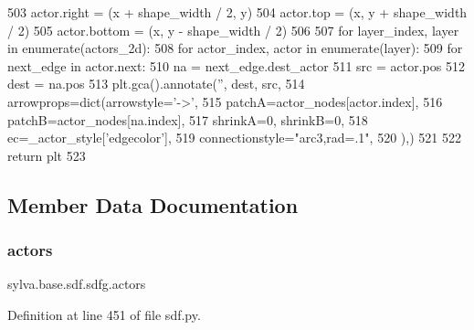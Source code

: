 \begin{DoxyCode}
503                     actor.right = (x + shape\_width / 2, y)
504                     actor.top = (x, y + shape\_width / 2)
505                     actor.bottom = (x, y - shape\_width / 2)
506 
507             \textcolor{keywordflow}{for} layer\_index, layer \textcolor{keywordflow}{in} enumerate(actors\_2d):
508                 \textcolor{keywordflow}{for} actor\_index, actor \textcolor{keywordflow}{in} enumerate(layer):
509                     \textcolor{keywordflow}{for} next\_edge \textcolor{keywordflow}{in} actor.next:
510                         na = next\_edge.dest\_actor
511                         src = actor.pos
512                         dest = na.pos
513                         plt.gca().annotate(\textcolor{stringliteral}{''}, dest, src,
514                                            arrowprops=dict(arrowstyle=\textcolor{stringliteral}{'->'},
515                                                            patchA=actor\_nodes[actor.index],
516                                                            patchB=actor\_nodes[na.index],
517                                                            shrinkA=0, shrinkB=0,
518                                                            ec=\_actor\_style[\textcolor{stringliteral}{'edgecolor'}],
519                                                            connectionstyle=\textcolor{stringliteral}{"arc3,rad=.1"},
520                                                            ),)
521 
522             \textcolor{keywordflow}{return} plt
523 \end{DoxyCode}


\subsection{Member Data Documentation}
\mbox{\label{classsylva_1_1base_1_1sdf_1_1sdfg_af732b01ce693d1d4b9fc0ebd99c3fdad}} 
\subsubsection{\texorpdfstring{actors}{actors}}
{\footnotesize\ttfamily sylva.\+base.\+sdf.\+sdfg.\+actors}



Definition at line 451 of file sdf.\+py.



